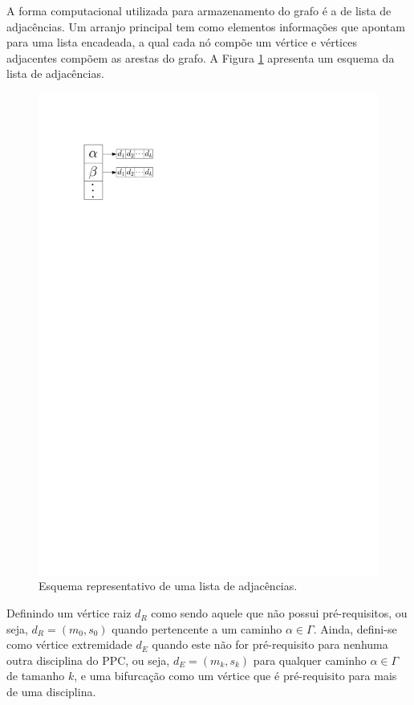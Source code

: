 \documentclass[a4paper, 12pt]{article}
\begin{document}
A forma computacional utilizada para armazenamento do grafo é a de lista de adjacências. Um arranjo principal tem como elementos informações que apontam para uma 
lista encadeada, a qual cada nó compõe um vértice e vértices adjacentes compõem as arestas do grafo. A Figura \ref{img:adjacencies_list} apresenta um 
esquema da lista de adjacências. \\

\begin{figure}[h]
\centering
\includegraphics[scale=0.8]{adjcencies_list.pdf}
\caption{Esquema representativo de uma lista de adjacências.}
\label{img:adjacencies_list}
\end{figure}

Definindo um vértice raiz $d_R$ como sendo aquele que não possui pré-requisitos, ou seja, $d_R = (m_0, s_0)$ quando pertencente a um caminho $\alpha \in \Gamma$. Ainda, 
defini-se como vértice extremidade $d_E$ quando este não for pré-requisito para nenhuma outra disciplina do PPC, ou seja, $d_E = (m_k, s_k)$ para qualquer caminho 
$\alpha \in \Gamma$ de tamanho $k$, e uma bifurcação como um vértice que é pré-requisito para mais de uma disciplina. \\
\end{document}
